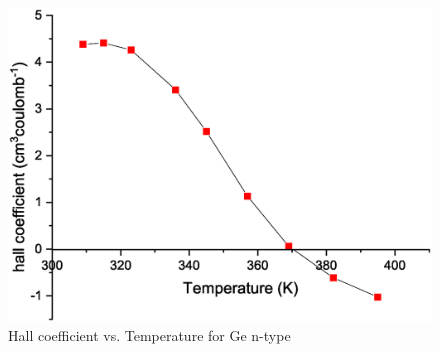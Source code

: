 		\begin{figure}[h]
			\centering
			\includegraphics[width=0.9\columnwidth]{images/rh.eps}
			\caption{Hall coefficient vs. Temperature for Ge n-type}
			\label{graph}
		\end{figure}
		
		